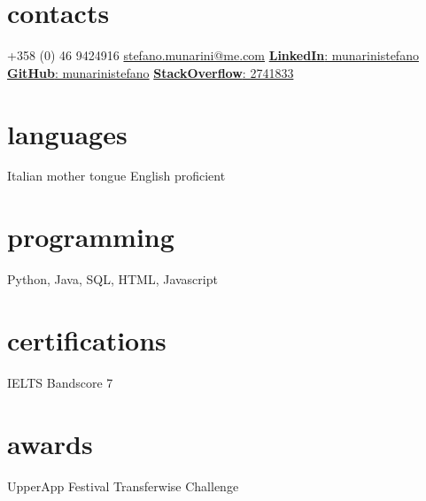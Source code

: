 \documentclass[]{friggeri-cv}
\begin{document}


\begin{aside}
\section{contacts}
+358 (0) 46 9424916
\href{mailto:stefano.munarini@me.com}{stefano.munarini@me.com}
\href{https://it.linkedin.com/in/munarinistefano}{\textbf{LinkedIn}:
munarinistefano}
\href{https://github.com/stefanomunarini}{\textbf{GitHub}:
munarinistefano}
\href{http://stackexchange.com/users/2741833/stefano-munarini}{\textbf{StackOverflow}:
2741833}
\section{languages}
Italian mother tongue
English proficient
\section{programming}
Python, Java, SQL, 
HTML, Javascript
\section{certifications}
IELTS Bandscore 7
\section{awards}
UpperApp Festival
Transferwise Challenge
\end{aside}

\end{document}
